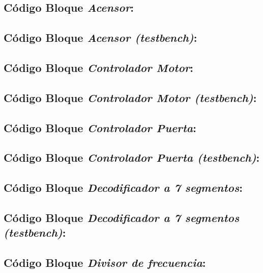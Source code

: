 \subsection{Código Bloque \textit{Acensor}:} \label{code:Acensor}

\subsection{Código Bloque \textit{Acensor (testbench)}:} \label{code:Acensor_tb}

\subsection{Código Bloque \textit{Controlador Motor}:} \label{code:ControladorMotor}

\subsection{Código Bloque \textit{Controlador Motor (testbench)}:} \label{code:ControladorMotor_tb}

\subsection{Código Bloque \textit{Controlador Puerta}:} \label{code:ControladorPuerta}

\subsection{Código Bloque \textit{Controlador Puerta (testbench)}:} \label{code:ControladorPuerta_tb}

\subsection{Código Bloque \textit{Decodificador a 7 segmentos}:} \label{code:Decodificador7s}

\subsection{Código Bloque \textit{Decodificador a 7 segmentos (testbench)}:} \label{code:Decodificador7s_tb}

\subsection{Código Bloque \textit{Divisor de frecuencia}:} \label{code:DivisorFrecuencia}

